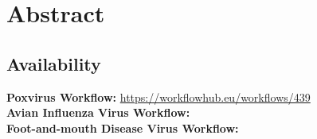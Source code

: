 \chapter*{Abstract}
\todoit

\section*{Availability}
\setlength{\parindent}{0pt}

\textbf{Poxvirus Workflow:} \url{https://workflowhub.eu/workflows/439} \\
\textbf{Avian Influenza Virus Workflow:} \url{} \\
\textbf{Foot-and-mouth Disease Virus Workflow:} \url{}

\setlength{\parindent}{18pt}